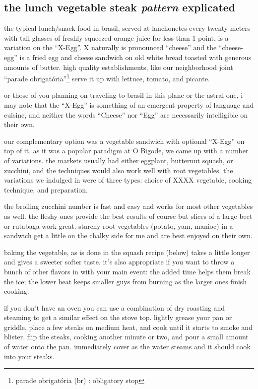 \subsection{the lunch vegetable steak \textit{pattern} explicated}

the typical lunch/snack food in brasil, served at lanchonetes every
twenty meters with tall glasses of freshly squeezed orange juice for
less than 1 point, is a variation on the ``X-Egg''. X naturally is
pronounced ``cheese'' and the ``cheese-egg'' is a fried egg and cheese
sandwich on old white bread toasted with generous amounts of
butter. high quality establishments, like our neighborhood joint
``parade obrigat\'{o}ria''\footnote{parade obrigat\'{o}ria (br) :
obligatory stop} serve it up with lettuce, tomato, and picante.

or those of you planning on traveling to brasil in this plane or the
astral one, i may note that the ``X-Egg'' is something of an emergent
property of language and cuisine, and neither the words ``Cheese'' nor
``Egg'' are necessarily intelligible on their own.

our complementary option was a vegetable sandwich with optional
``X-Egg'' on top of it. as it was a popular paradigm at O Bigode, we
came up with a number of variations. the markets usually had either
eggplant, butternut squash, or zucchini, and the techniques would also
work well with root vegetables. the variations we indulged in were of
three types: choice of XXXX vegetable, cooking technique, and
preparation.

the broiling zucchini number is fast and easy and works for most other
vegetables as well. the fleshy ones provide the best results of course
but slices of a large beet or rutabaga work great. starchy root
vegetables (potato, yam, manioc) in a sandwich get a little on the
chalky side for me and are best enjoyed on their own.

baking the vegetable, as is done in the squash recipe (below) takes a
little longer and gives a sweeter softer taste. it's also appropriate
if you want to throw a bunch of other flavors in with your main event:
the added time helps them break the ice; the lower heat keeps smaller
guys from burning as the larger ones finish cooking.

if you don't have an oven you can use a combination of dry roasting
and steaming to get a similar effect on the stove top. lightly grease
your pan or griddle, place a few steaks on medium heat, and cook until
it starts to smoke and blister. flip the steaks, cooking another
minute or two, and pour a small amount of water onto the
pan. immediately cover as the water steams and it should cook into
your steaks.

